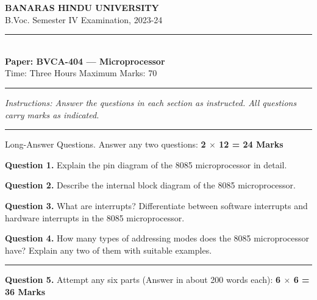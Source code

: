 \documentclass[11pt,a4paper]{article}
\begin{document}
\begin{center}
  {\large\bfseries BANARAS HINDU UNIVERSITY}\\[2pt]
  {
\normalsize B.Voc. Semester IV Examination, 2023-24}\\[6pt]
  \rule{0.8\linewidth}{0.5pt}\\[6pt]
  {\large\bfseries Paper: BVCA-404 --- Microprocessor}\\[4pt]
  {
\normalsize Time: Three Hours \hfill Maximum Marks: 70}
\end{center}

\rule{\linewidth}{0.4pt}

\smallskip



\noindent   \textit{Instructions: Answer the questions in each section as instructed. All questions carry marks as indicated.}

\bigskip




\rule{\linewidth}{0.4pt}\smallskip

Long-Answer Questions. Answer any two questions: \hfill   \textbf{2 $ \times$ 12 = 24 Marks}

\medskip



\noindent   \textbf{Question 1.} Explain the pin diagram of the 8085 microprocessor in detail.

\medskip



\noindent   \textbf{Question 2.} Describe the internal block diagram of the 8085 microprocessor.

\medskip



\noindent   \textbf{Question 3.} What are interrupts? Differentiate between software interrupts and hardware interrupts in the 8085 microprocessor.

\medskip



\noindent   \textbf{Question 4.} How many types of addressing modes does the 8085 microprocessor have? Explain any two of them with suitable examples.

\bigskip


\rule{\linewidth}{0.4pt}\smallskip




\noindent   \textbf{Question 5.} Attempt any six parts (Answer in about 200 words each): \hfill   \textbf{6 $ \times$ 6 = 36 Marks}
\end{document}
